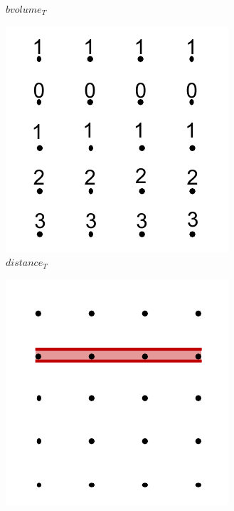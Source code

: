 \begin{figure}[!t]
\begin{subfigure}{0.243\linewidth}
\vspace{-5mm}
\caption{$bvolume_{T}$}
\label{fig:bvolumeT}
\end{subfigure}
\begin{subfigure}{0.243\linewidth}
\includegraphics[width=\linewidth]{Images/distanceT.pdf}
\vspace{-5mm}
\caption{$distance_{T}$}
\label{fig:distanceT}
\end{subfigure}
\begin{subfigure}{0.243\linewidth}
\includegraphics[width=\linewidth]{Images/zlsT.pdf}

\end{subfigure}
\end{figure}
